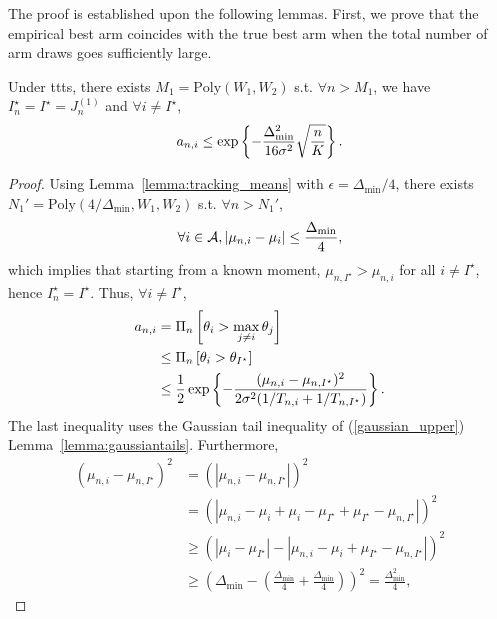 The proof is established upon the following lemmas. First, we prove that the empirical best arm coincides with the true best arm when the total number of arm draws goes sufficiently large.

\begin{lemma}\label{lemma:empirical_best}
\begin{leftbar}[lemmabar]
    Under \gls{ttts}, there exists $M_1 = \text{Poly}(W_1,W_2)$ s.t. $\forall n > M_1$, we have $I_n^\star = I^\star = J_n^{(1)}$ and $\forall i \neq I^\star$,
    \[
        a_{n,i} \leq \exp\left\{-\frac{\Delta_{\text{min}}^2}{16\sigma^2}\sqrt{\frac{n}{K}}\right\}.
    \]
\end{leftbar}
\end{lemma}

\begin{proof}
    Using Lemma~\ref{lemma:tracking_means} with $\epsilon = \Delta_{\min}/4$, there exists $N_1' = \text{Poly}(4/\Delta_{\min},W_1,W_2)$ s.t. $\forall n > N_1'$,
    \[
        \forall i\in\mathcal{A}, |\mu_{n,i} - \mu_i| \leq \frac{\Delta_{\min}}{4}, 
    \]
    which implies that starting from a known moment, $\mu_{n,I^\star} > \mu_{n,i}$ for all $i\neq I^\star$, hence $I_n^\star = I^\star$. Thus, $\forall i \neq I^\star$,
    \begin{align*}
        a_{n,i} &= \Pi_{n}\left[\theta_i > \max_{j\neq i} \theta_j\right]\\
                             &\leq \Pi_{n}\left[\theta_i > \theta_{I^\star}\right]\\
                             &\leq \frac{1}{2}\exp\left\{-\frac{(\mu_{n,i}-\mu_{n,I^\star})^2}{2\sigma^2(1/T_{n,i}+1/T_{n,I^\star})}\right\}.
    \end{align*}
    The last inequality uses the Gaussian tail inequality of (\ref{gaussian_upper}) Lemma~\ref{lemma:gaussiantails}. Furthermore,
    \begin{align*}
        (\mu_{n,i} - \mu_{n,I^\star})^2 &= (|\mu_{n,i} - \mu_{n,I^\star}|)^2\\
                                        &= (|\mu_{n,i} - \mu_i + \mu_i - \mu_{I^\star} + \mu_{I^\star} -\mu_{n,I^\star}|)^2\\
                                        &\geq (|\mu_i - \mu_{I^\star}| - |\mu_{n,i} - \mu_i + \mu_{I^\star} -\mu_{n,I^\star}|)^2\\
                                        &\geq \left(\Delta_{\text{min}} - \left(\frac{\Delta_{\text{min}}}{4} + \frac{\Delta_{\text{min}}}{4}\right)\right)^2 = \frac{\Delta_{\text{min}}^2}{4},
    \end{align*}

\end{proof}

